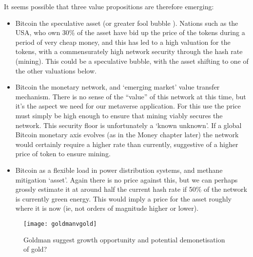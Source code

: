 It seems possible that three value propositions are therefore emerging:
\begin{itemize}
\item Bitcoin the speculative asset (or greater fool bubble \cite{de1990positive}). Nations such as the USA, who own 30\% of the asset have bid up the price of the tokens during a period of very cheap money, and this has led to a high valuation for the tokens, with a commensurately high network security through the hash rate (mining). This could be a speculative bubble, with the asset shifting to one of the other valuations below.
\item Bitcoin the monetary network, and `emerging market' value transfer mechanism. There is no sense of the ``value'' of this network at this time, but it's the aspect we need for our metaverse application. For this use the price must simply be high enough to ensure that mining viably secures the network. This security floor is unfortunately a `known unknown'. If a global Bitcoin monetary axis evolves (as in the Money chapter later) the network would certainly require a higher rate than currently, suggestive of a higher price of token to ensure mining.
\item Bitcoin as a flexible load in power distribution systems, and methane mitigation `asset'. Again there is no price against this, but we can perhaps grossly estimate it at around half the current hash rate if 50\% of the network is currently green energy. This would imply a price for the asset roughly where it is now (ie, not orders of magnitude higher or lower).  
\end{itemize}
\begin{figure}
  \centering
    \texttt{[image: goldmanvgold]}
  \caption{Goldman suggest growth opportunity and potential demonetisation of gold?}
  \label{fig:goldmanVgold}
\end{figure}
